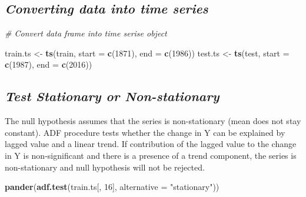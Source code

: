 \documentclass[12pt,openany]{book}
\newenvironment{Shaded}{\begin{snugshade}}{\end{snugshade}}
\newcommand{\CommentTok}[1]{\textcolor[rgb]{0.56,0.35,0.01}{\textit{#1}}}
\newcommand{\DataTypeTok}[1]{\textcolor[rgb]{0.13,0.29,0.53}{#1}}
\newcommand{\DecValTok}[1]{\textcolor[rgb]{0.00,0.00,0.81}{#1}}
\newcommand{\KeywordTok}[1]{\textcolor[rgb]{0.13,0.29,0.53}{\textbf{#1}}}
\newcommand{\NormalTok}[1]{#1}
\newcommand{\StringTok}[1]{\textcolor[rgb]{0.31,0.60,0.02}{#1}}
\begin{document}
\hypertarget{converting-data-into-time-series-1}{%
\subsection{\texorpdfstring{\textbf{\emph{Converting data into time series}}}{Converting data into time series}}\label{converting-data-into-time-series-1}}

\begin{Shaded}
\begin{Highlighting}[]
\CommentTok{# Convert data frame into time serise object}

\NormalTok{train.ts <-}\StringTok{ }\KeywordTok{ts}\NormalTok{(train, }\DataTypeTok{start =} \KeywordTok{c}\NormalTok{(}\DecValTok{1871}\NormalTok{), }\DataTypeTok{end =} \KeywordTok{c}\NormalTok{(}\DecValTok{1986}\NormalTok{))}
\NormalTok{test.ts <-}\StringTok{ }\KeywordTok{ts}\NormalTok{(test, }\DataTypeTok{start =} \KeywordTok{c}\NormalTok{(}\DecValTok{1987}\NormalTok{), }\DataTypeTok{end =} \KeywordTok{c}\NormalTok{(}\DecValTok{2016}\NormalTok{))}
\end{Highlighting}
\end{Shaded}

\hypertarget{test-stationary-or-non-stationary-1}{%
\subsection{\texorpdfstring{\textbf{\emph{Test Stationary or Non-stationary}}}{Test Stationary or Non-stationary}}\label{test-stationary-or-non-stationary-1}}

The null hypothesis assumes that the series is non-stationary (mean does not stay constant). ADF procedure tests whether the change in Y can be explained by lagged value and a linear trend. If contribution of the lagged value to the change in Y is non-significant and there is a presence of a trend component, the series is non-stationary and null hypothesis will not be rejected.

\begin{Shaded}
\begin{Highlighting}[]
\KeywordTok{pander}\NormalTok{(}\KeywordTok{adf.test}\NormalTok{(train.ts[, }\DecValTok{16}\NormalTok{], }\DataTypeTok{alternative =} \StringTok{"stationary"}\NormalTok{))}
\end{Highlighting}
\end{Shaded}
\end{document}
